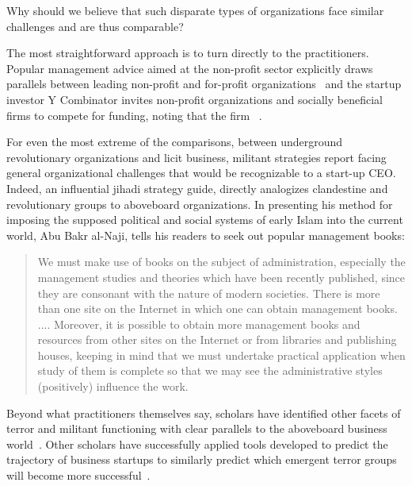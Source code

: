 Why should we believe that such disparate types of organizations face similar challenges and are thus comparable?

The most straightforward approach is to turn directly to the practitioners. Popular management advice aimed at the non-profit sector explicitly draws parallels between leading non-profit and for-profit organizations~\autocite{azevedo2018success, gaussndwhy} and the startup investor Y Combinator invites non-profit organizations and socially beneficial  firms to compete for funding, noting that the firm ~\autocite{walker2017what}.

For even the most extreme of the comparisons, between underground revolutionary organizations and licit business, militant strategies report facing general organizational challenges that would be recognizable to a start-up CEO. Indeed, an influential jihadi strategy guide,  directly analogizes clandestine and revolutionary groups to aboveboard organizations.  In presenting his method for imposing the supposed political and social systems of early Islam into the current world, Abu Bakr al-Naji, tells his readers to seek out popular management books:

\begin{quote}
We  must  make  use  of  books  on  the  subject  of  administration,  especially  the  management  studies and theories which have been recently published, since they are consonant with the nature  of  modern  societies.    There  is  more  than  one  site  on  the  Internet  in  which  one  can  obtain management books. .... Moreover,  it  is  possible  to  obtain  more  management  books  and  resources  from  other sites on the Internet or from libraries and publishing houses, keeping in mind that we must undertake practical application when study of them is complete so that we may see the administrative styles (positively) influence the work. \autocite[56]{mccants2006translation}
\end{quote}

Beyond what practitioners themselves say, scholars have identified other facets of terror and militant functioning with clear parallels to the aboveboard business world~\autocite{mironova2019freedom, shapiro2013terrorist}. Other scholars have successfully applied tools developed to predict the trajectory of business startups to similarly predict which emergent terror groups will become more successful~\autocite{yang2019quantifying}.

